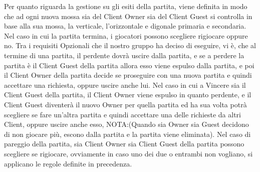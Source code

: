 \newline
Per quanto riguarda la gestione su gli esiti della partita, viene definita in modo che ad ogni nuova mossa sia del Client Owner sia del Client Guest si controlla in base alla sua mossa, la verticale, l'orizzontale e digonale primaria e secondaria. Nel caso in cui la partita termina, i giocatori possono scegliere rigiocare oppure no. Tra i requisiti Opzionali che il nostro gruppo ha deciso di eseguire, vi è, che al termine di una partita, il perdente dovrà uscire dalla partita, e se a perdere la partita è il Client Guest della partita allora esso viene espulso dalla partita, e poi il Client Owner della partita decide se proseguire con una nuova partita e quindi accettare una richiesta, oppure uscire anche lui. Nel caso in cui a Vincere sia il Client Guest della partita, il Client Owner viene espulso in quanto perdente, e il Client Guest diventerà il nuovo Owner per quella partita ed ha sua volta potrà scegliere se fare un'altra partita e quindi accettare una delle richieste da altri Client, oppure uscire anche esso, NOTA:(Quando sia Owner sia Guest decidono di non giocare più, escono dalla partita e la partita viene eliminata). Nel caso di pareggio della partita, sia Client Owner sia Client Guest della partita possono scegliere se rigiocare, ovviamente in caso uno dei due o entrambi non vogliano, si applicano le regole definite in precedenza.















